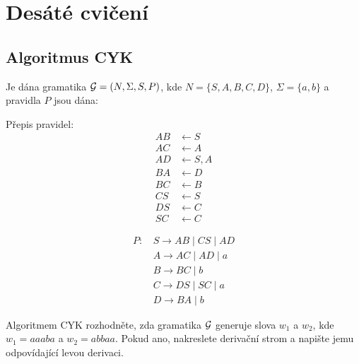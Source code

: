 \section{Desáté cvičení}

\subsection{Algoritmus CYK} %
Je dána gramatika $\mathcal{G} = (N, \Sigma, S, P)$, kde
$N = \{S, A, B, C, D\}$, $\Sigma = \{a, b\}$ a pravidla $P$ jsou dána:
\begin{multicols}{2}

    Přepis pravidel:
    \begin{align*}
        AB & \leftarrow S \\
        AC & \leftarrow A \\
        AD & \leftarrow S, A \\
        BA & \leftarrow D \\
        BC & \leftarrow B \\
        CS & \leftarrow S \\
        DS & \leftarrow C \\
        SC & \leftarrow C
    \end{align*}

\columnbreak

    \begin{align*}
        P \text{: } & S \rightarrow AB \mid CS \mid AD \\
        & A \rightarrow AC \mid AD \mid a \\
        & B \rightarrow BC \mid b \\
        & C \rightarrow DS \mid SC \mid a \\
        & D \rightarrow BA \mid b
    \end{align*}
\end{multicols}
Algoritmem CYK rozhodněte, zda gramatika $\mathcal{G}$ generuje slova $w_1$ a $w_2$, kde $w_1 = aaaba$ a $w_2 = abbaa$.
Pokud ano, nakreslete derivační strom a napište jemu odpovídající levou derivaci.


